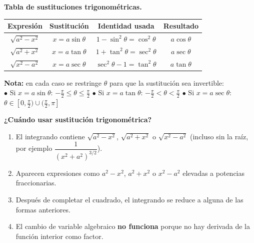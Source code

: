 \documentclass[12pt, letterpaper]{article}
\begin{document}
\begin{cuadroextra}
\textbf{Tabla de sustituciones trigonométricas.}

\vspace{6pt}
\begin{center}
\renewcommand{\arraystretch}{1.8}
\begin{tabular}{c c c c}
  \toprule
  \textbf{Expresión} & \textbf{Sustitución} & \textbf{Identidad usada} & \textbf{Resultado} \\
  \midrule
  $\sqrt{a^2 - x^2}$ & $x = a\sin\theta$ &
    $1-\sin^2\theta = \cos^2\theta$ & $a\cos\theta$ \\[4pt]
  $\sqrt{a^2 + x^2}$ & $x = a\tan\theta$ &
    $1+\tan^2\theta = \sec^2\theta$ & $a\sec\theta$ \\[4pt]
  $\sqrt{x^2 - a^2}$ & $x = a\sec\theta$ &
    $\sec^2\theta - 1 = \tan^2\theta$ & $a\tan\theta$ \\
  \bottomrule
\end{tabular}
\end{center}

\vspace{4pt}
\small
\textbf{Nota:} en cada caso se restringe $\theta$ para que la sustitución sea invertible:\\[2pt]
$\bullet$ Si $x = a\sin\theta$: \;$-\tfrac{\pi}{2}\leq\theta\leq\tfrac{\pi}{2}$\qquad
$\bullet$ Si $x = a\tan\theta$: \;$-\tfrac{\pi}{2}<\theta<\tfrac{\pi}{2}$\qquad
$\bullet$ Si $x = a\sec\theta$: \;$\theta\in[0,\tfrac{\pi}{2})\cup(\tfrac{\pi}{2},\pi]$
\end{cuadroextra}

\vspace{4pt}

\begin{cuadroadvertencia}
\small\textbf{¿Cuándo usar sustitución trigonométrica?}
\begin{enumerate}[leftmargin=*, itemsep=3pt]
  \item El integrando contiene $\sqrt{a^2 - x^2}$, $\sqrt{a^2 + x^2}$ o $\sqrt{x^2 - a^2}$
        (incluso sin la raíz, por ejemplo $\dfrac{1}{(x^2+a^2)^{3/2}}$).
  \item Aparecen expresiones como $a^2 - x^2$, $a^2 + x^2$ o $x^2 - a^2$ elevadas a
        potencias fraccionarias.
  \item Después de completar el cuadrado, el integrando se reduce a alguna de
        las formas anteriores.
  \item El cambio de variable algebraico \textbf{no funciona} porque no hay
        derivada de la función interior como factor.
\end{enumerate}
\end{cuadroadvertencia}
\end{document}
